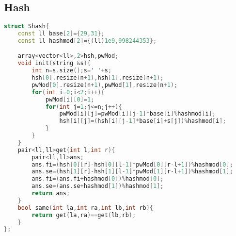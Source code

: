 \subsection{Hash}
  \begin{lstlisting}[language=c++]
struct Shash{
    const ll base[2]={29,31};
    const ll hashmod[2]={(ll)1e9,998244353};

    array<vector<ll>,2>hsh,pwMod;
    void init(string &s){
        int n=s.size();s=' '+s;
        hsh[0].resize(n+1),hsh[1].resize(n+1);
        pwMod[0].resize(n+1),pwMod[1].resize(n+1);
        for(int i=0;i<2;i++){
            pwMod[i][0]=1;
            for(int j=1;j<=n;j++){
                pwMod[i][j]=pwMod[i][j-1]*base[i]%hashmod[i];
                hsh[i][j]=(hsh[i][j-1]*base[i]+s[j])%hashmod[i];
            }
        }
    }
    pair<ll,ll>get(int l,int r){
        pair<ll,ll>ans;
        ans.fi=(hsh[0][r]-hsh[0][l-1]*pwMod[0][r-l+1])%hashmod[0];
        ans.se=(hsh[1][r]-hsh[1][l-1]*pwMod[1][r-l+1])%hashmod[1];
        ans.fi=(ans.fi+hashmod[0])%hashmod[0];
        ans.se=(ans.se+hashmod[1])%hashmod[1];
        return ans;
    }
    bool same(int la,int ra,int lb,int rb){
        return get(la,ra)==get(lb,rb);
    }
};
  \end{lstlisting}
